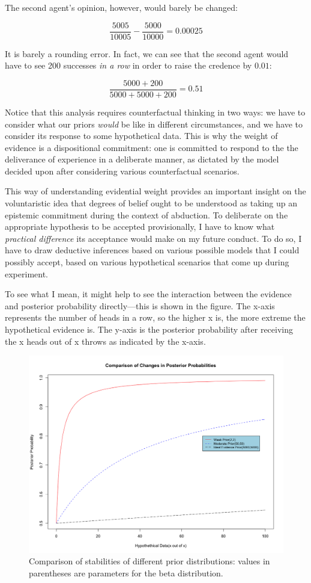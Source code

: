 The second agent's opinion, however, would barely be changed:

\[\frac{5005}{10005} - \frac{5000}{10000} = 0.00025\]

It is barely a rounding error. In fact, we can see that the second agent
would have to see 200 successes \emph{in a row} in order to raise the
credence by \(0.01\):

\[\frac{5000+200}{5000+5000+200} = 0.51\]

Notice that this analysis requires counterfactual thinking in two ways:
we have to consider what our priors \emph{would} be like in different
circumstances, and we have to consider its response to some hypothetical
data. This is why the weight of evidence is a dispositional commitment:
one is committed to respond to the the deliverance of experience in a
deliberate manner, as dictated by the model decided upon after
considering various counterfactual scenarios.

This way of understanding evidential weight provides an important
insight on the voluntaristic idea that degrees of belief ought to be
understood as taking up an epistemic commitment during the context of
abduction. To deliberate on the appropriate hypothesis to be accepted
provisionally, I have to know what \emph{practical difference} its
acceptance would make on my future conduct. To do so, I have to draw
deductive inferences based on various possible models that I could
possibly accept, based on various hypothetical scenarios that come up
during experiment.

To see what I mean, it might help to see the interaction between the
evidence and posterior probability directly---this is shown in the
figure. The x-axis represents the number of heads in a row, so the
higher x is, the more extreme the hypothetical evidence is. The y-axis
is the posterior probability after receiving the x heads out of x throws
as indicated by the x-axis.

\begin{figure}
\centering
\includegraphics[scale=0.3]{rescompare}
\caption{Comparison of stabilities of different prior distributions:
values in parentheses are parameters for the beta distribution.}
\label{fig:res}
\end{figure}

